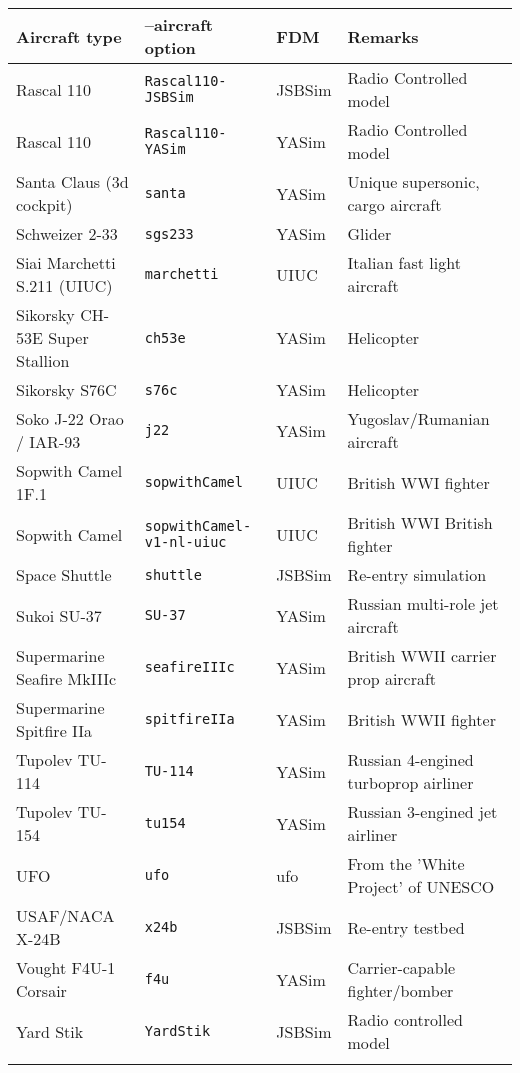 \noindent
\begin{tabular}{l|l|l|l}
Aircraft type       & --aircraft option & FDM    & Remarks\\\hline
   Rascal 110       & \texttt{Rascal110-JSBSim} & JSBSim & Radio Controlled model\\
   Rascal 110       & \texttt{Rascal110-YASim} & YASim & Radio Controlled model\\
   Santa Claus (3d cockpit) & \texttt{santa} & YASim & Unique supersonic, cargo aircraft\\
   Schweizer 2-33 & \texttt{sgs233} & YASim & Glider\\
   Siai Marchetti S.211 (UIUC) & \texttt{marchetti} & UIUC & Italian fast light aircraft\\
   Sikorsky CH-53E Super Stallion & \texttt{ch53e} & YASim & Helicopter\\
   Sikorsky S76C & \texttt{s76c} & YASim & Helicopter\\
   Soko J-22 Orao / IAR-93 & \texttt{j22} & YASim & Yugoslav/Rumanian aircraft\\
   Sopwith Camel 1F.1 & \texttt{sopwithCamel} & UIUC & British WWI fighter\\
   Sopwith Camel & \texttt{sopwithCamel-v1-nl-uiuc} & UIUC & British WWI British fighter\\
   Space Shuttle & \texttt{shuttle} & JSBSim & Re-entry simulation\\
   Sukoi SU-37      & \texttt{SU-37} & YASim & Russian multi-role jet aircraft\\
   Supermarine Seafire MkIIIc & \texttt{seafireIIIc} & YASim & British WWII carrier prop aircraft\\
   Supermarine Spitfire IIa & \texttt{spitfireIIa} & YASim & British WWII fighter \\
   Tupolev TU-114 & \texttt{TU-114} & YASim & Russian 4-engined turboprop airliner\\
   Tupolev TU-154 & \texttt{tu154} & YASim & Russian 3-engined jet airliner\\
   UFO& \texttt{ufo} & ufo &  From the 'White Project' of UNESCO \\
   USAF/NACA X-24B & \texttt{x24b} & JSBSim & Re-entry testbed\\
   Vought F4U-1 Corsair & \texttt{f4u} & YASim & Carrier-capable fighter/bomber\\
   Yard Stik & \texttt{YardStik} & JSBSim & Radio controlled model \\
   \\
\end{tabular}

